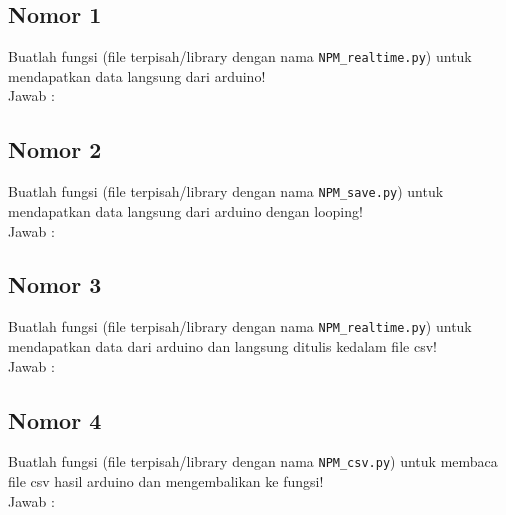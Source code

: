 \subsection{Nomor 1}
Buatlah  fungsi  (file  terpisah/library  dengan  nama  \verb|NPM_realtime.py|)  untuk mendapatkan data langsung dari arduino!\\
Jawab :\\


\subsection{Nomor 2}
Buatlah fungsi (file terpisah/library dengan nama \verb|NPM_save.py|) untuk mendapatkan data langsung dari arduino dengan looping!\\
Jawab :\\


\subsection{Nomor 3}
Buatlah  fungsi  (file  terpisah/library  dengan  nama  \verb|NPM_realtime.py|) untuk mendapatkan data dari arduino dan langsung ditulis kedalam file csv!\\
Jawab :\\


\subsection{Nomor 4}
Buatlah fungsi (file terpisah/library dengan nama \verb|NPM_csv.py|) untuk membaca file csv hasil arduino dan mengembalikan ke fungsi!\\
Jawab :\\

